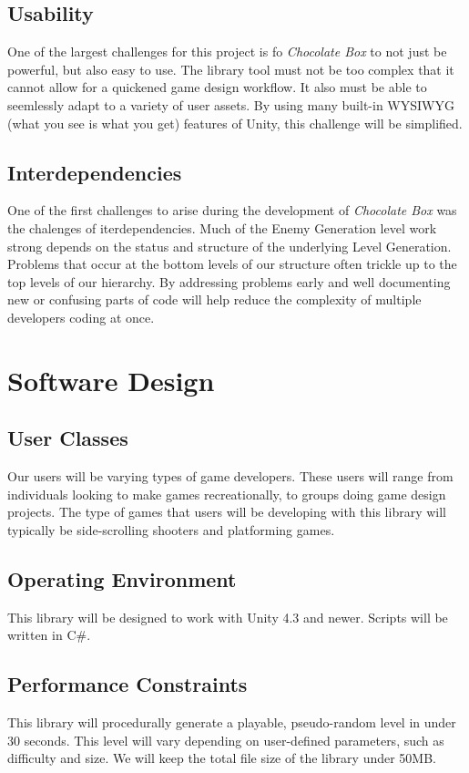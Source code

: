 \documentclass[pdftex,12pt,letter]{article}
\begin{document}
\begin{itemize}
\begin{itemize}
\begin{itemize}
\subsection{Usability}
One of the largest challenges for this project is fo \textit{Chocolate Box} to not just be powerful, but also easy to use. The library tool must not be too complex that it cannot allow for a quickened game design workflow. It also must be able to seemlessly adapt to a variety of user assets. By using many built-in WYSIWYG (what you see is what you get) features of Unity, this challenge will be simplified. 
\subsection{Interdependencies}
One of the first challenges to arise during the development of \textit{Chocolate Box} was the chalenges of iterdependencies. Much of the Enemy Generation level work strong depends on the status and structure of the underlying Level Generation. Problems that occur at the bottom levels of our structure often trickle up to the top levels of our hierarchy. By addressing problems early and well documenting new or confusing parts of code will help reduce the complexity of multiple developers coding at once. 


\section{Software Design}
\subsection{User Classes}
Our users will be varying types of game developers. These users will range from individuals looking to make games recreationally, to groups doing game design projects. The type of games that users will be developing with this library will typically be side-scrolling shooters and platforming games.
\subsection{Operating Environment}
This library will be designed to work with Unity 4.3 and newer. Scripts will be written in C\#.
\subsection{Performance Constraints}
This library will procedurally generate a playable, pseudo-random level in under 30 seconds. This level will vary depending on user-defined parameters, such as difficulty and size. We will keep the total file size of the library under 50MB.

\end{itemize}
\end{itemize}
\end{itemize}
\end{document}
